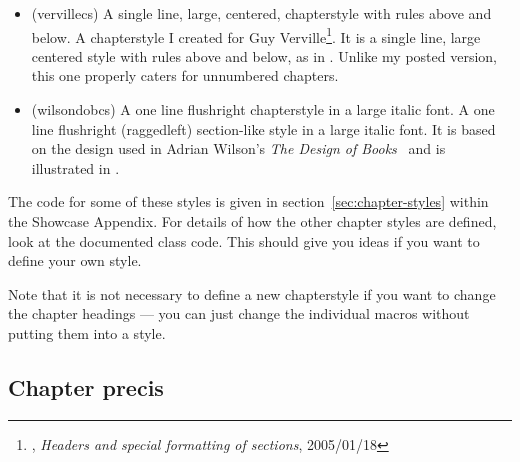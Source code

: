 \begin{itemize}



\item[\cstyle{verville}]
\glossary(vervillecs)%
  {}%
  {A single line, large, centered, chapterstyle with rules above and below.}
 A chapterstyle I created for
  Guy Verville\footnote{\ctt,
  \textit{Headers and special formatting of sections}, 2005/01/18}.
  It is a single line, large centered style with rules above
  and below, as in . Unlike my posted version,
  this one properly caters for unnumbered chapters.


\item[\cstyle{wilsondob}]
\glossary(wilsondobcs)%
  {}%
  {A one line flushright chapterstyle in a large italic font.}
A one line flushright (raggedleft) section-like style in a large italic font.
It is based on the design used in
Adrian Wilson's \textit{The Design of Books}~\cite{ADRIANWILSON93} and
is illustrated in
.


\end{itemize}


The code for some of these styles is given in
section~\ref{sec:chapter-styles} within the Showcase Appendix.  For
details of how the other chapter styles are defined, look at the
documented class code. This should give you ideas if you want to
define your own style.

Note that it is not necessary to define a new chapterstyle if you want
to change the chapter headings --- you can just change the individual
macros without putting them into a style.




\subsection{Chapter precis}
\label{sec:chapter-precis}


